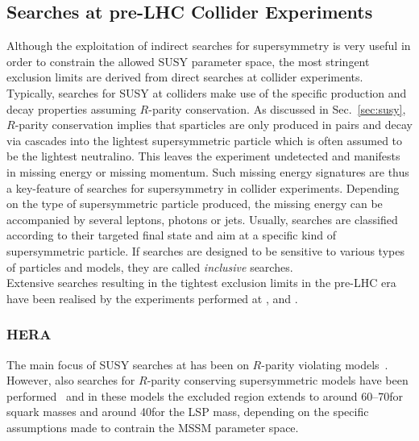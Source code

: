 \subsection{Searches at pre-LHC Collider Experiments}
\label{subsec:susy_collider_pre-lhc}
Although the exploitation of indirect searches for supersymmetry is very useful in order to constrain the allowed SUSY parameter space, the most stringent exclusion limits are derived from direct searches at collider experiments. Typically, searches for SUSY at colliders make use of the specific production and decay properties assuming $R$-parity conservation. As discussed in Sec.~\ref{sec:susy}, $R$-parity conservation implies that sparticles are only produced in pairs and decay via cascades into the lightest supersymmetric particle which is often assumed to be the lightest neutralino. This leaves the experiment undetected and manifests in missing energy or missing momentum. Such missing energy signatures are thus a key-feature of searches for supersymmetry in collider experiments. Depending on the type of supersymmetric particle produced, the missing energy can be accompanied by several leptons, photons or jets. Usually, searches are classified according to their targeted final state and aim at a specific kind of supersymmetric particle. If searches are designed to be sensitive to various types of particles and models, they are called \textit{inclusive} searches. \\  
Extensive searches resulting in the tightest exclusion limits in the pre-LHC era have been realised by the experiments performed at \hera, \lep and \tevatron.

\subsubsection*{HERA}
The main focus of SUSY searches at \hera has been on $R$-parity violating models~\cite{Aktas:2004ij, Aktas:2004tm, Zeus:2006je}. However, also searches for $R$-parity conserving supersymmetric models have been performed~\cite{Aid:1996es, Breitweg:1998gk} and in these models the excluded region extends to around 60--70\gev for squark masses and around 40\gev for the LSP mass, depending on the specific assumptions made to contrain the MSSM parameter space. %

